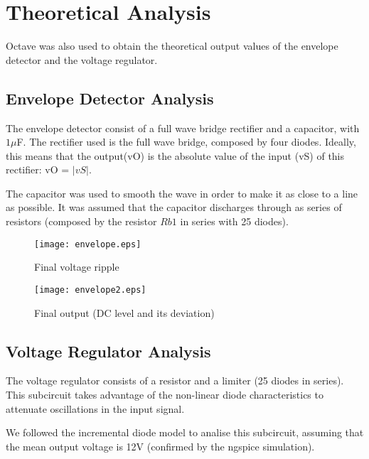 \section{Theoretical Analysis} \label{sec:analysis}


Octave was also used to obtain the theoretical output values of the envelope detector and the voltage regulator. 



\subsection{Envelope Detector Analysis}

The envelope detector consist of a full wave bridge rectifier and a capacitor, with $1\mu$F.
The rectifier used is the full wave bridge, composed by four diodes. Ideally, this means that the output(vO) is the absolute value of the input (vS) of this rectifier: vO = $|vS|$.

The capacitor was used to smooth the wave in order to make it as close to a line as possible. It was assumed that the capacitor discharges through as series of resistors (composed by the resistor $Rb1$ in series with 25 diodes).

\begin{figure}[h] \centering
  \begin{minipage}{.5\textwidth}
    \texttt{[image: envelope.eps]}
    \caption{Final voltage ripple}
    \label{fig:simenv}
    \end{minipage}%
  \begin{minipage}{.5\textwidth}
  \centering
    \texttt{[image: envelope2.eps]}
    \caption{Final output (DC level and its deviation)}
    \label{fig:compenv}
      \end{minipage}%
\end{figure}




\subsection{Voltage Regulator Analysis}

The voltage regulator consists of a resistor and a limiter (25 diodes in series). This subcircuit takes advantage of the non-linear diode characteristics to attenuate oscillations in the input signal.

We followed the incremental diode model to analise this subcircuit, assuming that the mean output voltage is 12V (confirmed by the ngspice simulation).



